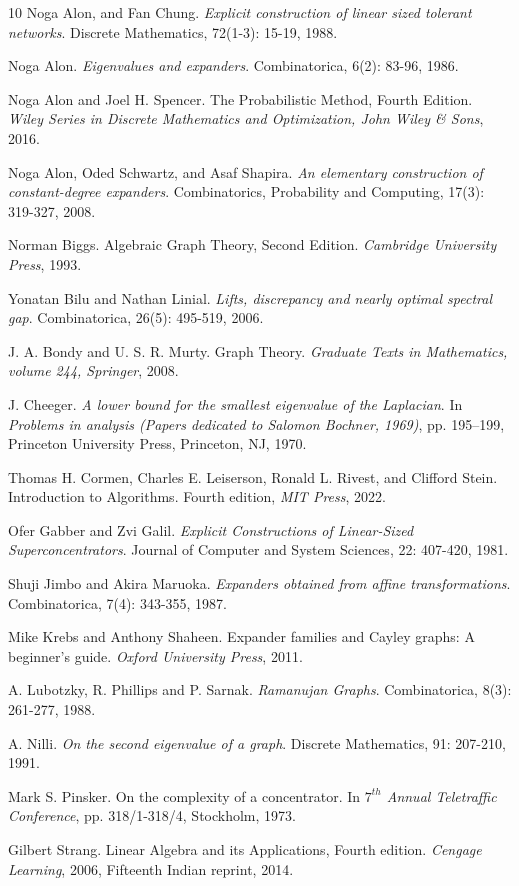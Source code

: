 \documentclass{article}
\begin{document}
\begin{thebibliography}{10}
{\sc Noga Alon, and Fan Chung}. {\em Explicit construction of linear sized tolerant networks}. Discrete Mathematics, 72(1-3): 15-19, 1988.

{\sc Noga Alon}. {\em Eigenvalues and expanders}. Combinatorica, 6(2): 83-96, 1986.

{\sc Noga Alon and Joel H. Spencer}. {The Probabilistic Method, Fourth Edition}. {\em Wiley Series in Discrete Mathematics and Optimization, John Wiley \& Sons}, 2016.

{\sc Noga Alon, Oded Schwartz, and Asaf Shapira}. {\em An elementary construction of constant-degree expanders}. Combinatorics, Probability and Computing, 17(3): 319-327, 2008.

{\sc Norman Biggs}. {Algebraic Graph Theory}, Second Edition. {\em Cambridge University Press}, 1993.

{\sc Yonatan Bilu and Nathan Linial}. {\em Lifts, discrepancy and nearly optimal spectral gap}. Combinatorica, 26(5): 495-519, 2006.

{\sc J. A. Bondy and U. S. R. Murty}. {Graph Theory}. {\em Graduate Texts in Mathematics, volume 244, Springer}, 2008.

{\sc J. Cheeger}. {\em A lower bound for the smallest eigenvalue of the Laplacian}. In {\em Problems in analysis (Papers dedicated to Salomon Bochner, 1969)}, pp. 195–199, Princeton University Press, Princeton, NJ, 1970.

{\sc Thomas H. Cormen, Charles E. Leiserson, Ronald L. Rivest, and Clifford Stein}. {Introduction to Algorithms}. Fourth edition, {\em MIT Press}, 2022.

{\sc Ofer Gabber and Zvi Galil}. {\em Explicit Constructions of Linear-Sized Superconcentrators}. Journal of Computer and System Sciences,  22: 407-420, 1981.

{\sc Shuji Jimbo and Akira Maruoka}. {\em Expanders obtained from affine transformations}. Combinatorica, 7(4): 343-355, 1987.

{\sc Mike Krebs and Anthony Shaheen}. {Expander families and Cayley graphs: A beginner's guide}. {\em Oxford University Press}, 2011.

{\sc A. Lubotzky, R. Phillips and P. Sarnak}. {\em Ramanujan Graphs}. Combinatorica, 8(3): 261-277, 1988.

{\sc A. Nilli}. {\em On the second eigenvalue of a graph}. Discrete Mathematics, 91: 207-210, 1991.

{\sc Mark S. Pinsker}. {On the complexity of a concentrator}. In {\em $7^{th}$ Annual Teletraffic Conference}, pp. 318/1-318/4, Stockholm, 1973.

{\sc Gilbert Strang}. {Linear Algebra and its Applications}, Fourth edition. {\em Cengage Learning}, 2006, Fifteenth Indian reprint, 2014.

\end{thebibliography}
\end{document}
